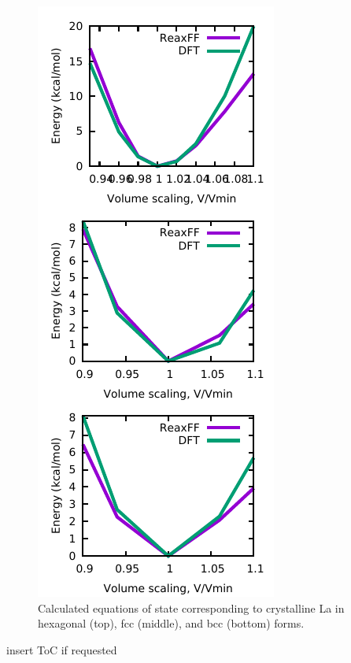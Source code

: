 \documentclass[journal=jpcafh,manuscript=article]{achemso}
\begin{document}
\begin{figure}[hbtp]
\centering
\includegraphics[scale=1]{three-La-eos.pdf}
\caption{Calculated equations of state corresponding to crystalline La in hexagonal (top), fcc (middle), and bcc (bottom) forms.}
\label{fig:laeos}
\end{figure}

\pagebreak



\pagebreak
\begin{tocentry}
\begin{center}
insert ToC if requested
\end{center}
\end{tocentry}
\end{document}
